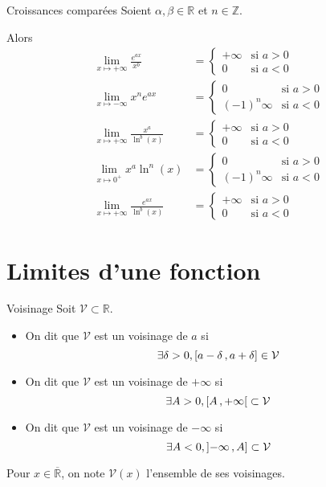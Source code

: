     \begin{theo}{Croissances comparées}{}
	Soient $\alpha,\beta \in \mathbb{R}$ et $n \in \mathbb{Z}$.

	Alors
	\begin{align*}
	 \lim\limits_{x \mapsto +\infty} \frac{e^{ax}}{x^b} &= \left\{ \begin{array}{cl}
			+ \infty & \text{si } a > 0 \\
			0  & \text{si } a < 0
		\end{array} \right. \\
	 \lim\limits_{x \mapsto -\infty} x^n e^{ax} &= \left\{ \begin{array}{cl}
			0 & \text{si } a > 0 \\
			(-1)^n \infty & \text{si } a < 0
		\end{array} \right. \\
	 \lim\limits_{x \mapsto +\infty} \frac{x^a}{\ln^b(x)} &= \left\{ \begin{array}{cl}
			+ \infty & \text{si }  a > 0\\
			0 & \text{si } a < 0
		\end{array} \right. \\
	 \lim\limits_{x \mapsto 0^+} x^a \ln^n(x) &= \left\{ \begin{array}{cl}
			0 & \text{si } a > 0 \\
			(-1)^n \infty & \text{si } a < 0
		\end{array} \right. \\
	 \lim\limits_{x \mapsto +\infty} \frac{e^{ax}}{\ln^b(x)} &= \left\{ \begin{array}{cl}
			+ \infty & \text{si } a > 0 \\
			0 & \text{si } a < 0
		\end{array} \right. 
	\end{align*}
    \end{theo}

\section{Limites d’une fonction}

    \begin{defi}{Voisinage}{}
        Soit $\mathcal{V} \subset \mathbb{R}$.
        \begin{itemize}
            \item On dit que $\mathcal{V}$ est un voisinage de $a$ si 
            \[ \exists \delta > 0, \left[ a-\delta \, , a + \delta \right] \in \mathcal{V} \]
            \item On dit que $\mathcal{V}$ est un voisinage de $+\infty$ si 
            \[ \exists A > 0, \left[ A \, , +\infty \right[ \subset \mathcal{V} \]
            \item On dit que $\mathcal{V}$ est un voisinage de $-\infty$ si 
            \[ \exists A < 0, \left] -\infty \, , A \right] \subset \mathcal{V} \]
        \end{itemize} 
        Pour $x \in \overline{\mathbb{R}}$, on note $\mathcal{V}(x)$ l’ensemble de ses voisinages.
    \end{defi}

